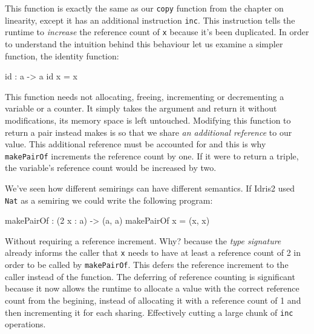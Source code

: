 \documentclass[
]{article}
\newenvironment{Shaded}{}{}
\newcommand{\DecValTok}[1]{\textcolor[rgb]{0.25,0.63,0.44}{#1}}
\newcommand{\FunctionTok}[1]{\textcolor[rgb]{0.02,0.16,0.49}{#1}}
\newcommand{\NormalTok}[1]{#1}
\newcommand{\OperatorTok}[1]{\textcolor[rgb]{0.40,0.40,0.40}{#1}}
\newcommand{\OtherTok}[1]{\textcolor[rgb]{0.00,0.44,0.13}{#1}}
\begin{document}
This function is exactly the same as our \texttt{copy} function from the
chapter on linearity, except it has an additional instruction
\texttt{inc}. This instruction tells the runtime to \emph{increase} the
reference count of \texttt{x} because it's been duplicated. In order to
understand the intuition behind this behaviour let us examine a simpler
function, the identity function:

\begin{Shaded}
\begin{Highlighting}[]
\FunctionTok{id} \OperatorTok{:}\NormalTok{ a }\OtherTok{{-}\textgreater{}}\NormalTok{ a}
\FunctionTok{id}\NormalTok{ x }\OtherTok{=}\NormalTok{ x}
\end{Highlighting}
\end{Shaded}

This function needs not allocating, freeing, incrementing or
decrementing a variable or a counter. It simply takes the argument and
return it without modifications, its memory space is left untouched.
Modifying this function to return a pair instead makes is so that we
share \emph{an additional reference} to our value. This additional
reference must be accounted for and this is why \texttt{makePairOf}
increments the reference count by one. If it were to return a triple,
the variable's reference count would be increased by two.

We've seen how different semirings can have different semantics. If
Idris2 used \texttt{Nat} as a semiring we could write the following
program:

\begin{Shaded}
\begin{Highlighting}[]
\NormalTok{makePairOf }\OperatorTok{:}\NormalTok{ (}\DecValTok{2}\NormalTok{ x }\OperatorTok{:}\NormalTok{ a) }\OtherTok{{-}\textgreater{}}\NormalTok{ (a, a)}
\NormalTok{makePairOf x }\OtherTok{=}\NormalTok{ (x, x)}
\end{Highlighting}
\end{Shaded}

Without requiring a reference increment. Why? because the \emph{type
signature} already informs the caller that \texttt{x} needs to have at
least a reference count of 2 in order to be called by
\texttt{makePairOf}. This defers the reference increment to the caller
instead of the function. The deferring of reference counting is
significant because it now allows the runtime to allocate a value with
the correct reference count from the begining, instead of allocating it
with a reference count of 1 and then incrementing it for each sharing.
Effectively cutting a large chunk of \texttt{inc} operations.
\end{document}
